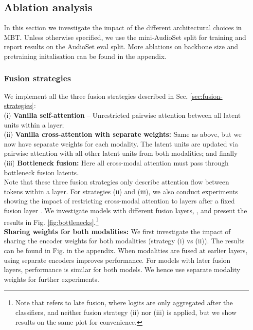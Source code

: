\subsection{Ablation analysis} \label{sec:ablations}
In this section we investigate the impact of the different architectural choices in MBT. Unless otherwise specified, we use the mini-AudioSet split for training and report results on the AudioSet eval split. More ablations on backbone size and pretraining initalisation can be found in the appendix. 
\subsubsection{Fusion strategies} \label{sec:ablations-fusion}
We implement all the three fusion strategies described in Sec. \ref{sec:fusion-strategies}: \\
(i) \textbf{Vanilla self-attention} -- Unrestricted pairwise attention between all latent units within a layer; \\
(ii) \textbf{Vanilla cross-attention with separate weights:} Same as above, but we now have separate weights for each modality. The latent units are updated via pairwise attention with all other latent units from both modalities; and finally \\
(iii) \textbf{Bottleneck fusion:} Here all cross-modal attention must pass through bottleneck fusion latents. \\
Note that these three fusion strategies only describe attention flow between tokens within a layer. For strategies (ii) and (iii), we also conduct experiments showing the impact of restricting cross-modal attention to layers after a fixed fusion layer . We investigate models with different fusion layers, , and present the results in Fig. \ref{fig:bottlenecks}.\footnote{Note that  refers to late fusion, where logits are only aggregated after the classifiers, and neither fusion strategy (ii) nor (iii) is applied, but we show results on the same plot for convenience.} \\
\noindent\textbf{Sharing weights for both modalities:} We first investigate the impact of sharing the encoder weights for both modalities (strategy (i) vs (ii)). The results can be found in Fig. 
\if{} \else{\ref{fig:weights}}
\fi
 in the appendix. When modalities are fused at earlier layers, using separate encoders improves performance. For models with later fusion layers, performance is similar for both models. We hence use separate modality weights for further experiments. \\
